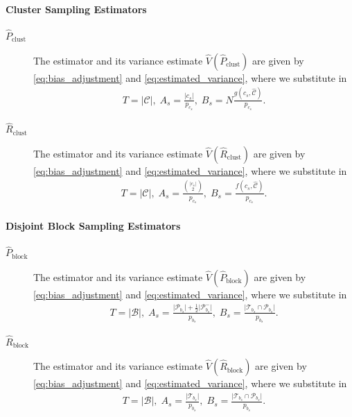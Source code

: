 \documentclass[fontsize=11pt]{article}
\theoremstyle{definition}
\begin{document}
\paragraph{Cluster Sampling Estimators}

\begin{description}
    \item[$\widehat{P}_{\text{clust}}$]{The estimator and its variance estimate $\widehat{V}(\widehat{P}_{\text{clust}})$ are given by \eqref{eq:bias_adjustment} and \eqref{eq:estimated_variance}, where we substitute in}
    \begin{align}
        T = |\mathcal{C}|,\; A_s = \frac{|c_s|}{p_{c_s}},\; B_s = N\frac{g(c_s,\widehat{\mathcal{C}})}{p_{c_s}}.
    \end{align}
    \item[$\widehat{R}_{\text{clust}}$]{The estimator and its variance estimate $\widehat{V}(\widehat{R}_{\text{clust}})$ are given by \eqref{eq:bias_adjustment} and \eqref{eq:estimated_variance}, where we substitute in}
    \begin{align}
    T = |\mathcal{C}|,\; A_s = \frac{{\lvert c_s \rvert \choose 2}}{p_{c_s}},\; B_s = \frac{f(c_s,\widehat{\mathcal{C}})}{p_{c_s}}. 
    \end{align}
\end{description}

\paragraph{Disjoint Block Sampling Estimators}

\begin{description}
    \item[$\widehat{P}_{\text{block}}$]{The estimator and its variance estimate $\widehat{V}(\widehat{P}_{\text{block}})$ are given by \eqref{eq:bias_adjustment} and \eqref{eq:estimated_variance}, where we substitute in}
    \begin{align}\label{eq:P_block}
        T = |\mathcal{B}|,\; A_s = \frac{\lvert \mathcal{P}_{b_s} \rvert + \frac{1}{2} \lvert \mathcal{P}_{b_s}^{-} \rvert}{p_{b_s}},\;
        B_s = \frac{\lvert \mathcal{T}_{b_s} \cap \mathcal{P}_{b_s} \rvert}{p_{b_s}}.
    \end{align}
    \item[$\widehat{R}_{\text{block}}$]{The estimator and its variance estimate $\widehat{V}(\widehat{R}_{\text{block}})$ are given by \eqref{eq:bias_adjustment} and \eqref{eq:estimated_variance}, where we substitute in}
    \begin{align}
        T = |\mathcal{B}|,\; A_s = \frac{\lvert \mathcal{T}_{b_s} \rvert}{p_{b_s}},\; B_s = 
        \frac{\lvert \mathcal{T}_{b_s} \cap \mathcal{P}_{b_s} \rvert}{p_{b_s}}.
    \end{align}
\end{description}
\end{document}
